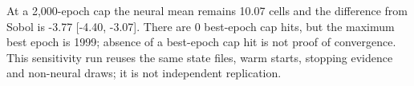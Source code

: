 At a 2,000-epoch cap the neural mean remains 10.07 cells and the difference from Sobol is -3.77 [-4.40, -3.07]. There are 0 best-epoch cap hits, but the maximum best epoch is 1999; absence of a best-epoch cap hit is not proof of convergence. This sensitivity run reuses the same state files, warm starts, stopping evidence and non-neural draws; it is not independent replication.
